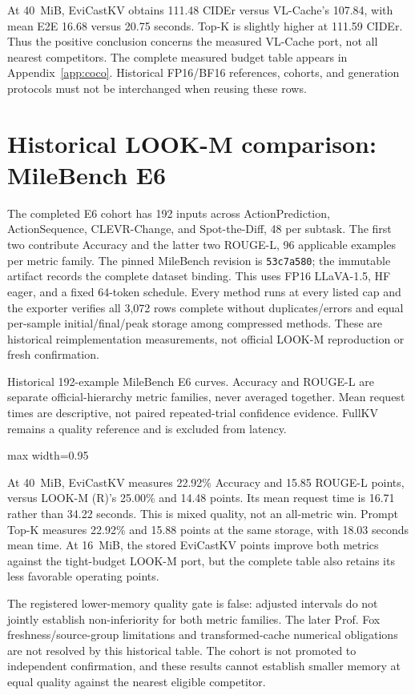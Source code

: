 \documentclass[10pt,letterpaper]{article}
\newcommand{\Evi}{EviCastKV}
\newcommand{\resulttable}[2]{\begin{center}\small\begin{adjustbox}{max width=#1}\end{adjustbox}\end{center}}
\begin{document}
At 40~MiB, \Evi{} obtains 111.48 CIDEr versus VL-Cache's 107.84, with
mean E2E 16.68 versus 20.75 seconds. Top-K is slightly higher at 111.59
CIDEr. Thus the positive conclusion concerns the measured VL-Cache port,
not all nearest competitors. The complete measured budget table appears
in Appendix~\ref{app:coco}. Historical FP16/BF16 references, cohorts, and
generation protocols must not be interchanged when reusing these rows.

\section{Historical LOOK-M comparison: MileBench E6}
\label{sec:milehistory}
The completed E6 cohort has 192 inputs across ActionPrediction,
ActionSequence, CLEVR-Change, and Spot-the-Diff, 48 per subtask. The first
two contribute Accuracy and the latter two ROUGE-L, 96 applicable examples
per metric family. The pinned MileBench revision is
\nolinkurl{53c7a580}; the immutable artifact records the complete dataset
binding. This uses FP16 LLaVA-1.5, HF eager, and a fixed 64-token schedule.
Every method runs at every listed cap and the exporter verifies all 3,072
rows complete without duplicates/errors and equal per-sample initial/final/peak
storage among compressed methods. These are historical reimplementation
measurements, not official LOOK-M reproduction or fresh confirmation.

\begin{table}[htbp]
\caption{Historical 192-example MileBench E6 curves. Accuracy and ROUGE-L
are separate official-hierarchy metric families, never averaged together.
Mean request times are descriptive, not paired repeated-trial confidence
evidence. FullKV remains a quality reference and is excluded from latency.}
\label{tab:milehistory}
\resulttable{0.95\linewidth}{mile192}
\end{table}

At 40~MiB, \Evi{} measures 22.92\% Accuracy and 15.85 ROUGE-L points,
versus LOOK-M (R)'s 25.00\% and 14.48 points. Its mean request time is
16.71 rather than 34.22 seconds. This is mixed quality, not an all-metric
win. Prompt Top-K measures 22.92\% and 15.88 points at the same storage,
with 18.03 seconds mean time. At 16~MiB, the stored \Evi{} points improve
both metrics against the tight-budget LOOK-M port, but the complete table
also retains its less favorable operating points.

The registered lower-memory quality gate is false: adjusted intervals do
not jointly establish non-inferiority for both metric families. The later
Prof. Fox freshness/source-group limitations and transformed-cache numerical
obligations are not resolved by this historical table. The cohort is not
promoted to independent confirmation, and these results cannot establish
smaller memory at equal quality against the nearest eligible competitor.
\end{document}
